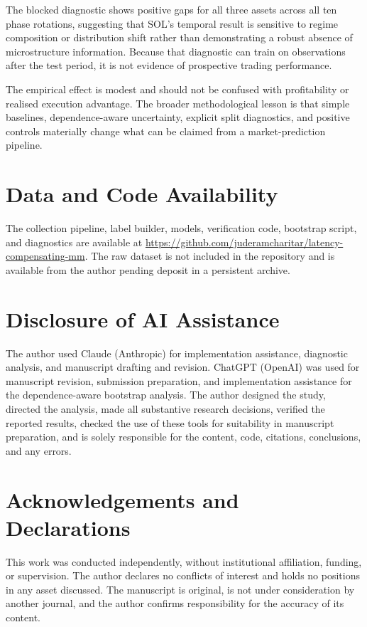 \documentclass[11pt]{article}
\begin{document}
The blocked diagnostic shows positive gaps for all three assets across all ten phase rotations, suggesting that SOL's temporal result is sensitive to regime composition or distribution shift rather than demonstrating a robust absence of microstructure information. Because that diagnostic can train on observations after the test period, it is not evidence of prospective trading performance.

The empirical effect is modest and should not be confused with profitability or realised execution advantage. The broader methodological lesson is that simple baselines, dependence-aware uncertainty, explicit split diagnostics, and positive controls materially change what can be claimed from a market-prediction pipeline.

\section*{Data and Code Availability}
The collection pipeline, label builder, models, verification code, bootstrap script, and diagnostics are available at \url{https://github.com/juderamcharitar/latency-compensating-mm}. The raw dataset is not included in the repository and is available from the author pending deposit in a persistent archive.

\section*{Disclosure of AI Assistance}
The author used Claude (Anthropic) for implementation assistance, diagnostic analysis, and manuscript drafting and revision. ChatGPT (OpenAI) was used for manuscript revision, submission preparation, and implementation assistance for the dependence-aware bootstrap analysis. The author designed the study, directed the analysis, made all substantive research decisions, verified the reported results, checked the use of these tools for suitability in manuscript preparation, and is solely responsible for the content, code, citations, conclusions, and any errors.

\section*{Acknowledgements and Declarations}
This work was conducted independently, without institutional affiliation, funding, or supervision. The author declares no conflicts of interest and holds no positions in any asset discussed. The manuscript is original, is not under consideration by another journal, and the author confirms responsibility for the accuracy of its content.
\end{document}
